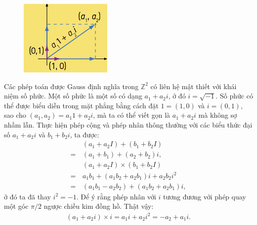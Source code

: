 \begin{multicols}{2}
\begin{tBox}
\begin{figure}
			\vspace*{-15pt}
			\centering
			\captionsetup{labelformat= empty, justification=centering}
			\hspace*{-12pt}\includegraphics[width= 1.15\linewidth]{mosaique-6.png}
			\vspace*{-15pt}
		\end{figure}
		Các phép toán được Gauss định nghĩa trong $\mathbb Z^2$ có liên hệ mật thiết với khái niệm số phức. Một số phức là một số có dạng $a_1 + a_2 i$, ở đó $i = \sqrt{-1}$. Số phức có thể được biểu diễn trong mặt phẳng bằng cách đặt $1 = (1, 0)$ và $i = (0, 1)$, sao cho $(a_1, a_2) = a_1 1 + a_2 i$, mà ta có thể viết gọn là $a_1 + a_2 i$ mà không sợ nhầm lẫn. Thực hiện phép cộng và phép nhân thông thường với các biểu thức đại số $a_1 + a_2 i$ và $b_1 + b_2 i$, ta được:
		\begin{align*}
			&(a_1 + a_2 I) + (b_1 + b_2 I) \\
			= \,&(a_1 + b_1) + (a_2 + b_2) i, \\
			&(a_1 + a_2 I) \times (b_1 + b_2 I) \\
			= \,&a_1 b_1 + (a_1 b_2 + a_2 b_1) i + a_2 b_2 i^2 \\
			= \,&( a_1  b_1 - a_2  b_2) + (a_1 b_2 + a_2 b_1) i ,
		\end{align*}
		ở đó ta đã thay $i^2 = -1$.
		\vskip 0.1cm
		Để ý rằng phép nhân với $i$ tương đương với phép quay một góc $\pi / 2$ ngược chiều kim đồng hồ. Thật vậy:
		\begin{align*}
			(a_1 + a_2 i) \times i = a_1 i + a_2 i^2 = -a_2 + a_1 i.

\end{align*}
\end{tBox}
\end{multicols}
